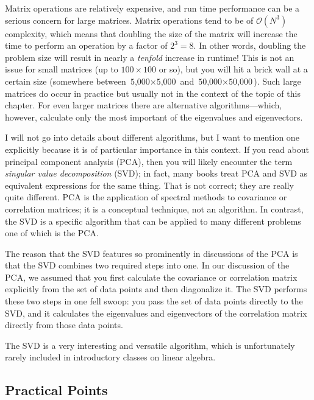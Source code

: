 Matrix operations are relatively
expensive, and run time performance can be a serious concern for large
matrices. Matrix operations tend to be of $\mathcal{O}(N^3)$ complexity,
which means that doubling the size\vadjust{\pagebreak} of the matrix will
increase the time to perform an operation by a factor of $2^3 = 8$. In
other words, doubling the problem size will result in nearly a
\emph{tenfold} increase in runtime! This is not an issue for small
matrices (up to $100 \times 100$ or so), but you will hit a brick wall
at a certain size (somewhere between $\text{5,000}
\times \text{5,000}$ and $\text{50,000} \times \text{50,000}$). Such
large matrices do occur in practice but usually not in the context of
the topic of this chapter.  For even larger matrices there are
alternative algorithms---\break which, however, calculate only the most
important of the eigenvalues and eigenvectors.

I will not go into details about different algorithms, but I want to
mention one explicitly because it is of particular importance in this
context.  If you read about principal component analysis (PCA),
then you will likely encounter the term \emph{singular value
  decomposition} (SVD); in fact, many books treat PCA and SVD as
equivalent expressions for the same thing. That is not correct; they
are really quite different. PCA is the application of spectral methods
to covariance or correlation matrices; it is a conceptual technique,
not an algorithm. In contrast, the SVD is a specific algorithm that
can be applied to many different problems one of which is the PCA.

The reason that the SVD features so prominently in discussions of the
PCA is that the SVD combines two required steps into one.  In our
discussion of the PCA, we assumed that you first calculate the
covariance or correlation matrix explicitly from the set of data
points and then diagonalize it. The SVD performs these two steps in
one fell swoop: you pass the set of data points directly to the SVD,
and it calculates the eigenvalues and eigenvectors of the correlation
matrix directly from those data points. 

The SVD is a very interesting and versatile algorithm, which is
unfortunately rarely included in introductory classes on linear
algebra.

\subsection{Practical Points}

